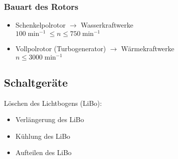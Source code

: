 \subsubsection{Bauart des Rotors}
\begin{itemize}
    \item Schenkelpolrotor $\rightarrow$ Wasserkraftwerke\\
        $100 \min^{-1}\leq n \leq 750 \min^{-1}$
    \item Vollpolrotor (Turbogenerator) $\rightarrow$ Wärmekraftwerke\\
        $n \leq 3000 \min^{-1}$
\end{itemize}

\subsection{Schaltgeräte}
Löschen des Lichtbogens (LiBo):
\begin{itemize}
\item Verlängerung des LiBo
\item Kühlung des LiBo
\item Aufteilen des LiBo
\end{itemize}

